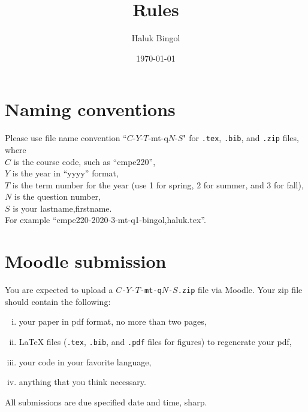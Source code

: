 \documentclass[11pt, oneside,twocolumn]{article}
\title{
	Rules
}
\author{Haluk Bingol}
\date{\today}
\newcommand{\hbCode}[1]{\texttt{#1}}
\theoremstyle{plain}
\theoremstyle{definition}
\theoremstyle{remark}
\begin{document}
\maketitle








\section{Naming conventions}

Please use file name convention ``$C$-$Y$-$T$-mt-q$N$-$S$" 
for 
\hbCode{.tex}, 
\hbCode{.bib}, and 
\hbCode{.zip} files,
where\\
$C$ is the course code, such as ``cmpe220'',\\
$Y$ is the year in ``yyyy'' format,\\
$T$ is the term number for the year (use 1 for spring, 2 for summer, and 3 for fall),\\
$N$ is the question number,\\
$S$ is your lastname,firstname.\\
For example
``cmpe220-2020-3-mt-q1-bingol,haluk.tex''.




\section{Moodle submission}

You are expected to upload a \hbCode{$C$-$Y$-$T$-mt-q$N$-$S$.zip} file via Moodle.
Your zip file should contain the following:
\begin{enumerate}[i.]
	
	\item 
	your paper in pdf format, no more than two pages,
	
	\item
	LaTeX files (\hbCode{.tex}, 
	\hbCode{.bib}, and 
	\hbCode{.pdf} files for figures) to regenerate your pdf,
	
	\item
	your code in your favorite language,
	
	\item
	anything that you think necessary.
	
\end{enumerate}

All submissions are due 
specified date and time, sharp.

\end{document}
